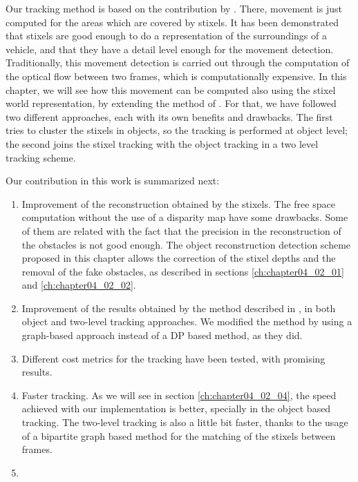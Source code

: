 Our tracking method is based on the contribution by \cite{gunyel2012stixels}. There, movement is just computed for the areas which are covered by stixels. It has been demonstrated that stixels are good enough to do a representation of the surroundings of a vehicle, and that they have a detail level enough for the movement detection. Traditionally, this movement detection is carried out through the computation of the optical flow between two frames, which is computationally expensive. In this chapter, we will see how this movement can be computed also using the stixel world representation, by extending the method of \cite{gunyel2012stixels}. For that, we have followed two different approaches, each with its own benefits and drawbacks. The first tries to cluster the stixels in objects, so the tracking is performed at object level; the second joins the stixel tracking with the object tracking in a two level tracking scheme.

Our contribution in this work is summarized next:
\begin{enumerate}
 \item Improvement of the reconstruction obtained by the stixels. The free space computation without the use of a disparity map have some drawbacks. Some of them are related with the fact that the precision in the reconstruction of the obstacles is not good enough. The object reconstruction detection scheme proposed in this chapter allows the correction of the stixel depths and the removal of the fake obstacles, as described in sections \ref{ch:chapter04_02_01} and \ref{ch:chapter04_02_02}.
 \item Improvement of the results obtained by the method described in \cite{gunyel2012stixels}, in both object and two-level tracking approaches. We modified the method by using a graph-based approach instead of a \ac{DP} based method, as they did. 
 \item Different cost metrics for the tracking have been tested, with promising results. 
 \item Faster tracking. As we will see in section \ref{ch:chapter04_02_04}, the speed achieved with our implementation is better, specially in the object based tracking. The two-level tracking is also a little bit faster, thanks to the usage of a bipartite graph based method for the matching of the stixels between frames.
 \item {}
\end{enumerate}

